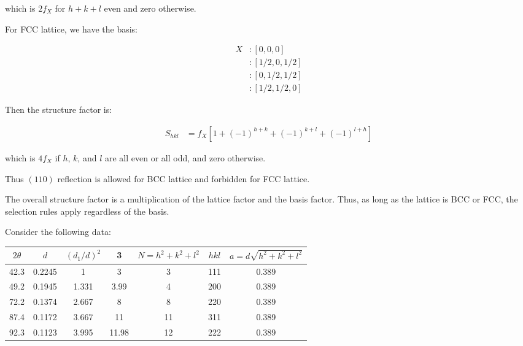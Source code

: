 \documentclass[12pt]{article}
\begin{document}
which is $2f_{X}$ for $h+k+l$ even and zero otherwise.

For FCC lattice, we have the basis:

\begin{equation}
    \begin{split}
        X & : [0, 0, 0] \\
        & : [1/2, 0, 1/2] \\
        & : [0, 1/2, 1/2] \\
        & : [1/2, 1/2, 0]
    \end{split}
\end{equation}

Then the structure factor is:

\begin{equation}
    \begin{split}
        S_{hkl} &= f_{X} \left[ 1 + (-1)^{h+k} + (-1)^{k+l} + (-1)^{l+h} \right]
    \end{split}
\end{equation}

which is $4f_{X}$ if $h$, $k$, and $l$ are all even or all odd, and zero otherwise.

Thus $(110)$ reflection is allowed for BCC lattice and forbidden for FCC lattice.

The overall structure factor is a multiplication of the lattice factor and the basis factor. Thus, as long as the lattice is BCC or FCC, the selection rules apply regardless of the basis.

Consider the following data:

\begin{table}[h!]
    \begin{tabular}{ccccccc}
        $2\theta$ & $d$    & $(d_{1}/d)^{2}$ & 3     & $N = h^{2} + k^{2} + l^{2}$ & ${hkl}$ & $a=d\sqrt{h^{2} + k^{2} + l^{2}}$ \\ \hline
        42.3      & 0.2245 & 1               & 3     & 3                           & 111     & 0.389                             \\
        49.2      & 0.1945 & 1.331           & 3.99  & 4                           & 200     & 0.389                             \\
        72.2      & 0.1374 & 2.667           & 8     & 8                           & 220     & 0.389                             \\
        87.4      & 0.1172 & 3.667           & 11    & 11                          & 311     & 0.389                             \\
        92.3      & 0.1123 & 3.995           & 11.98 & 12                          & 222     & 0.389
    \end{tabular}
\end{table}
\end{document}
